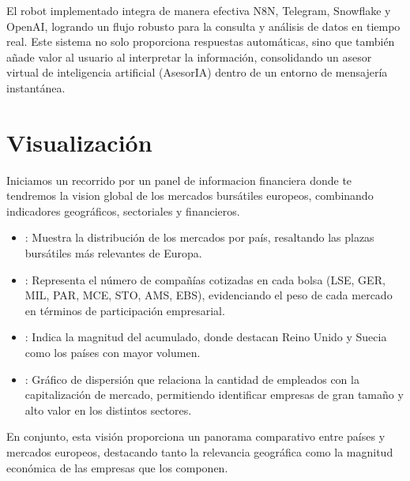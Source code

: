 \documentclass[letterpaper,10pt,spanish]{sphinxmanual}
\begin{document}
\sphinxAtStartPar
El robot implementado integra de manera efectiva N8N, Telegram, Snowflake y OpenAI, logrando un flujo robusto para la consulta y análisis de datos en tiempo real. Este sistema no solo proporciona respuestas automáticas, sino que también añade valor al usuario al interpretar la información, consolidando un asesor virtual de inteligencia artificial (AsesorIA) dentro de un entorno de mensajería instantánea.

\sphinxAtStartPar
{}

\sphinxAtStartPar
{}


\section{Visualización}
\label{\detokenize{ImplementacionAcesorIA:visualizacion}}
\sphinxAtStartPar
Iniciamos un recorrido por un panel de informacion financiera donde te tendremos la vision global de los mercados bursátiles europeos, combinando indicadores geográficos, sectoriales y financieros.
\begin{itemize}
\item {} 
\sphinxAtStartPar
{}: Muestra la distribución de los mercados por país, resaltando las plazas bursátiles más relevantes de Europa.

\item {} 
\sphinxAtStartPar
{}: Representa el número de compañías cotizadas en cada bolsa (LSE, GER, MIL, PAR, MCE, STO, AMS, EBS), evidenciando el peso de cada mercado en términos de participación empresarial.

\item {} 
\sphinxAtStartPar
{}: Indica la magnitud del  acumulado, donde destacan Reino Unido y Suecia como los países con mayor volumen.

\item {} 
\sphinxAtStartPar
{}: Gráfico de dispersión que relaciona la cantidad de empleados con la capitalización de mercado, permitiendo identificar empresas de gran tamaño y alto valor en los distintos sectores.

\end{itemize}

\sphinxAtStartPar
En conjunto, esta visión proporciona un panorama comparativo entre países y mercados europeos, destacando tanto la relevancia geográfica como la magnitud económica de las empresas que los componen.
\end{document}
